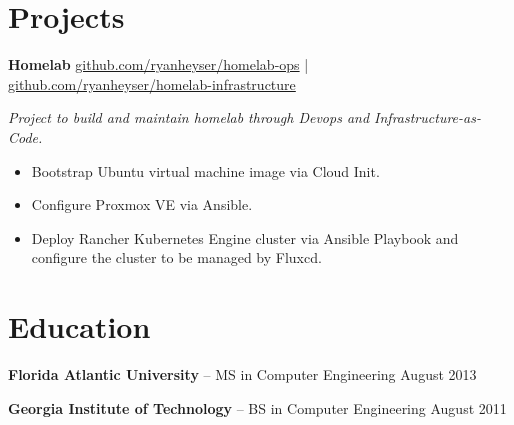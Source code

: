 \documentclass[11pt]{article}       %
\begin{document}
\vspace{-18.5pt}

\section*{Projects}
\begin{description}
\item\textbf{Homelab} \hfill \href{https://github.com/ryanheyser/homelab-ops}{github.com/ryanheyser/homelab-ops} | \href{https://github.com/ryanheyser/homelab-infrastructure}{github.com/ryanheyser/homelab-infrastructure} \\
\item\textit{Project to build and maintain homelab through Devops and Infrastructure-as-Code.} \\
\vspace{-6.5pt}
\begin{itemize}
  \item Bootstrap Ubuntu virtual machine image via Cloud Init.
  \item Configure Proxmox VE via Ansible.
  \item Deploy Rancher Kubernetes Engine cluster via Ansible Playbook and configure the cluster to be managed by Fluxcd.
\end{itemize}
\end{description}

\vspace{-18.5pt}

\section*{Education}
\begin{description}
\item\textbf{Florida Atlantic University} -- MS in Computer Engineering \hfill August 2013
\vspace{-9.5pt}
\item\textbf{Georgia Institute of Technology} -- BS in Computer Engineering \hfill August 2011
\end{description}
\end{document}
